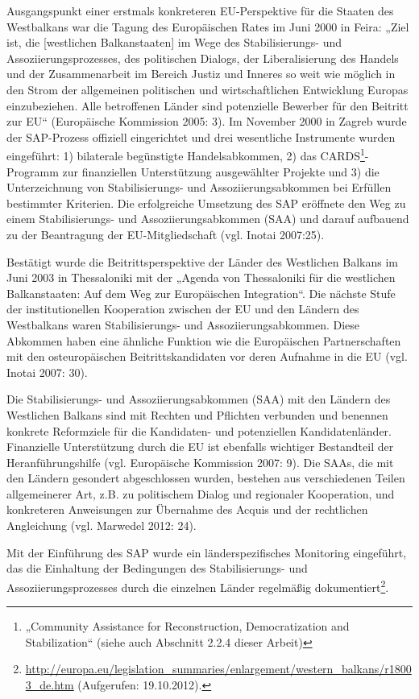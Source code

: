 Ausgangspunkt einer erstmals konkreteren EU-Perspektive für die Staaten des Westbalkans war die Tagung des Europäischen Rates im Juni 2000 in Feira: „Ziel ist, die [westlichen Balkanstaaten] im Wege des Stabilisierungs- und Assoziierungsprozesses, des politischen Dialogs, der Liberalisierung des Handels und der Zusammenarbeit im Bereich Justiz und Inneres so weit wie möglich in den Strom der allgemeinen politischen und wirtschaftlichen Entwicklung Europas einzubeziehen. Alle betroffenen Länder sind potenzielle Bewerber für den Beitritt zur EU“ (Europäische Kommission 2005: 3). Im November 2000 in Zagreb wurde der SAP-Prozess offiziell eingerichtet und drei wesentliche Instrumente wurden eingeführt: 1) bilaterale begünstigte Handelsabkommen, 2) das CARDS\footnote{„Community Assistance for Reconstruction, Democratization and Stabilization“ (siehe auch Abschnitt 2.2.4 dieser Arbeit)}-Programm zur finanziellen Unterstützung ausgewählter Projekte und 3) die Unterzeichnung von Stabilisierungs- und Assoziierungsabkommen bei Erfüllen bestimmter Kriterien. Die erfolgreiche Umsetzung des SAP eröffnete den Weg zu einem Stabilisierungs- und Assoziierungsabkommen (SAA) und darauf aufbauend zu der Beantragung der EU-Mitgliedschaft (vgl. Inotai 2007:25). \par
Bestätigt wurde die Beitrittsperspektive der Länder des Westlichen Balkans im Juni 2003 in Thessaloniki mit der „Agenda von Thessaloniki für die westlichen Balkanstaaten: Auf dem Weg zur Europäischen Integration“. Die nächste Stufe der institutionellen Kooperation zwischen der EU und den Ländern des Westbalkans waren Stabilisierungs- und Assoziierungsabkommen. Diese Abkommen haben eine ähnliche Funktion wie die Europäischen Partnerschaften mit den osteuropäischen Beitrittskandidaten vor deren Aufnahme in die EU (vgl. Inotai 2007: 30).\par
Die Stabilisierungs- und Assoziierungsabkommen (SAA) mit den Ländern des Westlichen Balkans sind mit Rechten und Pflichten verbunden und benennen konkrete Reformziele für die Kandidaten- und potenziellen Kandidatenländer. Finanzielle Unterstützung durch die EU ist ebenfalls wichtiger Bestandteil der Heranführungshilfe (vgl. Europäische Kommission 2007: 9). Die SAAs, die mit den Ländern gesondert abgeschlossen wurden, bestehen aus verschiedenen Teilen allgemeinerer Art, z.B. zu politischem Dialog und regionaler Kooperation, und konkreteren Anweisungen zur Übernahme des Acquis und der rechtlichen Angleichung (vgl. Marwedel 2012: 24).\par
Mit der Einführung des SAP wurde ein länderspezifisches Monitoring eingeführt, das die Einhaltung der Bedingungen des Stabilisierungs- und Assoziierungsprozesses durch die einzelnen Länder regelmäßig dokumentiert\footnote{\url{http://europa.eu/legislation_summaries/enlargement/western_balkans/r18003_de.htm} (Aufgerufen: 19.10.2012).}.\par
